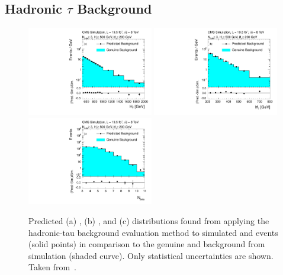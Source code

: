 \subsection{Hadronic $\tau$ Background}
\label{subsec:RA2_tauhad}
\begin{figure}[!t]
  \centering

  \begin{minipage}[c]{1.\textwidth}
    \begin{center}
      \includegraphics[width=0.49\textwidth]{figures/RA2_TauHad1.pdf}%
      \includegraphics[width=0.49\textwidth]{figures/RA2_TauHad2.pdf}\\ 
      \includegraphics[width=0.49\textwidth]{figures/RA2_TauHad3.pdf}
    \end{center}
  \end{minipage}

  \caption{Predicted (a) \HT, (b) \MHT, and (c) \NJets distributions found from applying the hadronic-tau background evaluation method to simulated \ttbar and \WJets events (solid points) in comparison to the genuine \ttbar and \WJets background from simulation (shaded curve). Only statistical uncertainties are shown. Taken from~\cite{Chatrchyan:2014lfa}.}
  \label{fig:ra2_tauhad}
\end{figure}

